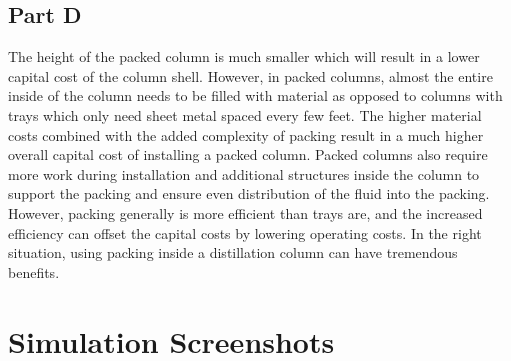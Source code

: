 \documentclass[12pt]{article}
\begin{document}
\subsection{Part D}
The height of the packed column is much smaller which will result in a lower capital cost of the column shell. However, in packed columns, almost the entire inside of the column needs to be filled with material as opposed to columns with trays which only need sheet metal spaced every few feet. The higher material costs combined with the added complexity of packing result in a much higher overall capital cost of installing a packed column. Packed columns also require more work during installation and additional structures inside the column to support the packing and ensure even distribution of the fluid into the packing. However, packing generally is more efficient than trays are, and the increased efficiency can offset the capital costs by lowering operating costs. In the right situation, using packing inside a distillation column can have tremendous benefits.



\section{Simulation Screenshots}
\end{document}
